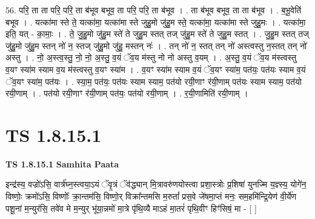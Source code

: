 \documentclass[17pt]{extarticle}
\begin{document}
56. परि॒ ता ता परि॒ परि॒ ता ब॑भूव बभूव॒ ता परि॒ परि॒ ता ब॑भूव । . ता ब॑भूव बभूव॒ ता ता ब॑भूव । . ब॒भू॒वेति॑ बभूव । . यत्का॑मा स्ते ते॒ यत्का॑मा॒ यत्का॑मा स्ते जुहु॒मो जु॑हु॒म स्ते॒ यत्का॑मा॒ यत्का॑मा स्ते जुहु॒मः । . यत्का॑मा॒ इति॒ यत् - का॒माः॒ । . ते॒ जु॒हु॒मो जु॑हु॒म स्ते॑ ते जुहु॒म स्तत् तज् जु॑हु॒म स्ते॑ ते जुहु॒म स्तत् । . जु॒हु॒म स्तत् तज् जु॑हु॒मो जु॑हु॒म स्तन् नो॑ न॒ स्तज् जु॑हु॒मो जु॑हु॒ मस्तन् नः॑ । . तन् नो॑ न॒ स्तत् तन् नो॑ अस्त्वस्तु न॒स्तत् तन् नो॑ अस्तु । . नो॒ अ॒स्त्व॒स्तु॒ नो॒ नो॒ अ॒स्तु॒ व॒यं ॅव॒य म॑स्तु नो नो अस्तु व॒यम् । . अ॒स्तु॒ व॒यं ॅव॒य म॑स्त्वस्तु व॒यꣳ स्या॑म स्याम व॒य म॑स्त्वस्तु व॒यꣳ स्या॑म । . व॒यꣳ स्या॑म स्याम व॒यं ॅव॒यꣳ स्या॑म॒ पत॑यः॒ पत॑यः स्याम व॒यं ॅव॒यꣳ स्या॑म॒ पत॑यः । . स्या॒म॒ पत॑यः॒ पत॑यः स्याम स्याम॒ पत॑यो रयी॒णाꣳ र॑यी॒णाम् पत॑यः स्याम स्याम॒ पत॑यो रयी॒णाम् । . पत॑यो रयी॒णाꣳ र॑यी॒णाम् पत॑यः॒ पत॑यो रयी॒णाम् । . र॒यी॒णामिति॑ रयी॒णाम् । \newline
\pagebreak
{}
\section*{ TS 1.8.15.1 }

\textbf{TS 1.8.15.1 } \newline
\textbf{Samhita Paata} \newline

इन्द्र॑स्य॒ वज्रो॑ऽसि॒ वार्त्र॑घ्न॒स्त्वया॒ऽयं ॅवृ॒त्रं ॅव॑द्ध्यान् मि॒त्रावरु॑णयोस्त्वा प्रशा॒स्त्रोः प्र॒शिषा॑ युनज्मि य॒ज्ञ्स्य॒ योगे॑न॒ विष्णोः॒ क्रमो॑ऽसि॒ विष्णोः᳚ क्रा॒न्तम॑सि॒ विष्णो॒र् विक्रा᳚न्तमसि म॒रुतां᳚ प्रस॒वे जे॑षमा॒प्तं मनः॒ सम॒हमि॑न्द्रि॒येण॑ वी॒र्ये॑ण पशू॒नां म॒न्युर॑सि॒ तवे॑व मे म॒न्युर् भू॑या॒न्नमो॑ मा॒त्रे पृ॑थि॒व्यै माऽहं मा॒तरं॑ पृथि॒वीꣳ हिꣳ॑सिषं॒ मा - [ ] \newline
\end{document}
